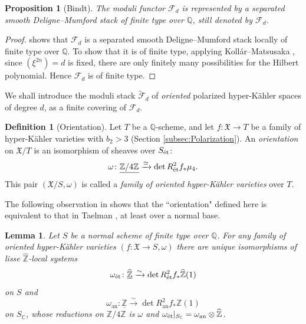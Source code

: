 \documentclass[11pt,reqno,oneside]{amsart}
\numberwithin{equation}{section}
\newtheorem{proposition}[theorem]{Proposition}
\newtheorem{lemma}[theorem]{Lemma}
\theoremstyle{definition}
\newtheorem{definition}[theorem]{Definition}
\DeclareMathOperator{\et}{\Acute{e}t}
\newcommand{\scF}{\mathscr{F}}
\newcommand{\CC}{\mathbb{C}}
\newcommand{\QQ}{\mathbb{Q}}
\newcommand{\ZZ}{\mathbb{Z}}
\newcommand{\fX}{\mathfrak{X}}
\begin{document}
\begin{proposition}[Bindt]
\label{prop:representabilityHyperK}
The moduli functor $\scF_d$ is represented by a separated smooth Deligne--Mumford stack of finite type over $\QQ$, still denoted by $\scF_d$. 
\end{proposition}
\begin{proof}
\cite[Theorem 3.3.2, Lemma 3.3.9]{BindtThesis} shows that  $\scF_d$ is a separated smooth Deligne--Mumford stack locally of finite type over $\QQ$. To show that it is of finite type, applying Koll\'ar--Matsusaka \cite{KM83}, since $(\xi^{2n})=d$ is fixed, there are only finitely many possibilities for the Hilbert polynomial. Hence $\scF_d$ is of finite type.
\end{proof}






We shall introduce the moduli stack $\widetilde{\scF}_d$ of \textit{oriented} polarized hyper-Kähler spaces of degree $d$, as a finite covering of $\scF_d$.
\begin{definition}[Orientation]
Let $T$ be a $\QQ$-scheme, and let $f \colon \fX\to  T$ be a family of hyper-Kähler varieties with $b_2>3$ (Section \ref{subsec:Polarization}). An \emph{orientation} on $\fX/T$ is an isomorphism of sheaves over $S_{\et}$:
\begin{equation}
   \omega \colon \underline{\ZZ/4\ZZ} \xrightarrow{\simeq} \det R^2_{\et} f_\ast \mu_4.
\end{equation}
This pair $(\fX/S,\omega)$ is called a \emph{family of oriented hyper-Kähler varieties} over $T$.
\end{definition}







The following observation in \cite[Lemma 4.3.2]{BindtThesis} shows that the ``orientation" defined here is equivalent to that in Taelman \cite{taelman17}, at least over a normal base.
\begin{lemma}\label{lemma:liftoforientation}
Let $S$ be a normal scheme of finite type over $\QQ$. For any family of oriented hyper-Kähler varieties $(f\colon \fX \to S, \omega)$ there are unique isomorphisms of lisse $\widehat{\ZZ}$-local systems
\[
\omega_{\et} \colon \underline{\widehat{\ZZ}} \xrightarrow{\sim} \det R^2_{\et}f_* \widehat{\ZZ}(1)
\]
on $S$ and 
\[
\omega_{\operatorname{an}} \colon \underline{\ZZ} \xrightarrow{\sim} \det R_{\operatorname{an}}^2f_* \ZZ(1)
\]
on $S_{\CC}$, 
whose reductions on $\ZZ/4\ZZ$ is $\omega$ and $\omega_{\et}|_{S_{\CC}} = \omega_{\operatorname{an}} \otimes \widehat{\ZZ}$.
\end{lemma}
\end{document}
